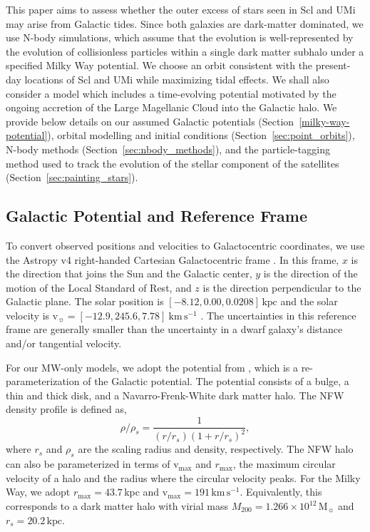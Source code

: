 \documentclass[linenumbers, twocolumn, twocolappendix]{aastex701}
\newcommand{\V}{\textrm{v}}
\newcommand{\vmax}{\V_\text{max}}
\newcommand{\rmax}{r_\text{max}}
\newcommand{\kpc}{\text{kpc}}
\newcommand{\kms}{\mathrm{km\,s^{-1}}}
\newcommand{\Mo}{\mathrm{M}_\sun}
\begin{document}
This paper aims to assess whether the outer excess of stars seen in Scl and UMi may arise from Galactic tides. Since both galaxies are dark-matter dominated, we use N-body simulations, which assume that the evolution is well-represented by the evolution of collisionless particles within a single dark matter subhalo under a specified Milky Way potential. We choose an orbit consistent with the present-day locations of Scl and UMi while maximizing tidal effects. We shall also consider a model which includes a time-evolving potential motivated by the ongoing accretion of the Large Magellanic Cloud into the Galactic halo.  We provide below details on our assumed Galactic potentials (Section~\ref{milky-way-potential}), orbital modelling and initial conditions (Section~\ref{sec:point_orbits}), N-body methods (Section~\ref{sec:nbody_methods}), and the particle-tagging method used to track the evolution of the stellar component of the satellites (Section~\ref{sec:painting_stars}).

\subsection{Galactic Potential and Reference Frame \label{milky-way-potential}}


To convert observed positions and velocities to Galactocentric
coordinates, we use the Astropy v4 right-handed Cartesian Galactocentric frame
\citep{astropycollaboration+2022}. In this frame, $x$ is the direction that joins the Sun and the Galactic center, $y$ is the direction of the motion of the Local
Standard of Rest, and $z$ is the direction perpendicular to the
Galactic plane. The solar position is
$[-8.12, 0.00, 0.0208]\, \kpc$
\citep{gravitycollaboration+2018, bennett+bovy2019} and the solar
velocity is $\V_\sun = [-12.9, 245.6, 7.78]\ \kms$
\citep{reid+brunthaler2004, drimmel+poggio2018, gravitycollaboration+2018}.
The uncertainties in this reference frame are generally smaller than the
uncertainty in a dwarf galaxy's distance and/or tangential velocity.

For our MW-only models, we adopt the potential from \citet{EP2020}, which is
a re-parameterization of the \citet{mcmillan2011} Galactic potential.
The potential consists of a \citet{hernquist1990} bulge, a \citet{miyamoto+nagai1975} thin and thick disk, and a Navarro-Frenk-White \citep[][hereafter NFW]{NFW1996, NFW1997} dark matter halo.
The NFW density profile is defined as,
\begin{equation}\label{eq:nfw}{
\rho/\rho_s= \frac{1}{(r/r_s)(1+r/r_s)^2},
}\end{equation}
where $r_s$ and $\rho_s$ are the scaling radius and density, respectively. The NFW halo can also be parameterized in terms of $\vmax$ and $\rmax$, the maximum circular velocity of a halo and the radius where the circular velocity peaks.  
For the Milky Way, we adopt $\rmax = 43.7\,$kpc and $\vmax = 191\,\kms$. Equivalently, this corresponds to a dark matter halo with virial mass  $M_{200} = 1.266\times 10^{12}\,\Mo$ and $r_s=20.2\,\kpc$.
\end{document}
